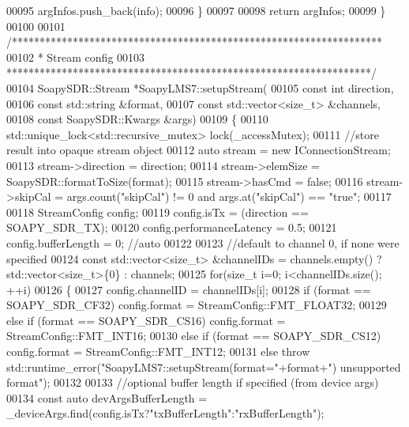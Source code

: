 \begin{DoxyCode}
00095         argInfos.push\_back(info);
00096     \}
00097 
00098     \textcolor{keywordflow}{return} argInfos;
00099 \}
00100 
00101 \textcolor{comment}{/*******************************************************************}
00102 \textcolor{comment}{ * Stream config}
00103 \textcolor{comment}{ ******************************************************************/}
00104 SoapySDR::Stream *SoapyLMS7::setupStream(
00105     \textcolor{keyword}{const} \textcolor{keywordtype}{int} direction,
00106     \textcolor{keyword}{const} std::string &format,
00107     \textcolor{keyword}{const} std::vector<size\_t> &channels,
00108     \textcolor{keyword}{const} SoapySDR::Kwargs &args)
00109 \{
00110     std::unique\_lock<std::recursive\_mutex> lock(\_accessMutex);
00111     \textcolor{comment}{//store result into opaque stream object}
00112     \textcolor{keyword}{auto} stream = \textcolor{keyword}{new} IConnectionStream;
00113     stream->direction = direction;
00114     stream->elemSize = SoapySDR::formatToSize(format);
00115     stream->hasCmd = \textcolor{keyword}{false};
00116     stream->skipCal = args.count(\textcolor{stringliteral}{"skipCal"}) != 0 and args.at(\textcolor{stringliteral}{"skipCal"}) == \textcolor{stringliteral}{"true"};
00117 
00118     StreamConfig config;
00119     config.isTx = (direction == SOAPY\_SDR\_TX);
00120     config.performanceLatency = 0.5;
00121     config.bufferLength = 0; \textcolor{comment}{//auto}
00122 
00123     \textcolor{comment}{//default to channel 0, if none were specified}
00124     \textcolor{keyword}{const} std::vector<size\_t> &channelIDs = channels.empty() ? std::vector<size\_t>\{0\} : channels;
00125     \textcolor{keywordflow}{for}(\textcolor{keywordtype}{size\_t} i=0; i<channelIDs.size(); ++i)
00126     \{
00127         config.channelID = channelIDs[i];
00128         \textcolor{keywordflow}{if} (format == SOAPY\_SDR\_CF32) config.format = StreamConfig::FMT_FLOAT32;
00129         \textcolor{keywordflow}{else} \textcolor{keywordflow}{if} (format == SOAPY\_SDR\_CS16) config.format = 
      StreamConfig::FMT_INT16;
00130         \textcolor{keywordflow}{else} \textcolor{keywordflow}{if} (format == SOAPY\_SDR\_CS12) config.format = 
      StreamConfig::FMT_INT12;
00131         \textcolor{keywordflow}{else} \textcolor{keywordflow}{throw} std::runtime\_error(\textcolor{stringliteral}{"SoapyLMS7::setupStream(format="}+format+\textcolor{stringliteral}{") unsupported format"});
00132 
00133         \textcolor{comment}{//optional buffer length if specified (from device args)}
00134         \textcolor{keyword}{const} \textcolor{keyword}{auto} devArgsBufferLength = \_deviceArgs.find(config.isTx?\textcolor{stringliteral}{"txBufferLength"}:\textcolor{stringliteral}{"rxBufferLength"});

\end{DoxyCode}
